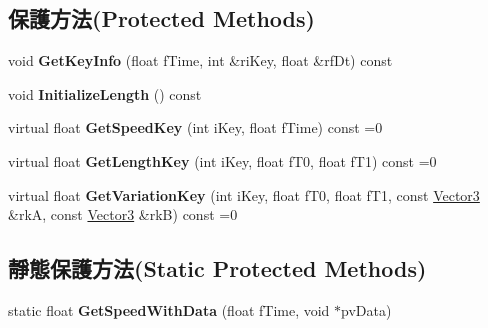 \subsection*{保護方法(Protected Methods)}
\begin{DoxyCompactItemize}
\item 
void {\bfseries Get\+Key\+Info} (float f\+Time, int \&ri\+Key, float \&rf\+Dt) const \hypertarget{class_magnum_1_1_multiple_curve3_a1b61f1be6ed93d15b55e7319123c106c}{}\label{class_magnum_1_1_multiple_curve3_a1b61f1be6ed93d15b55e7319123c106c}

\item 
void {\bfseries Initialize\+Length} () const \hypertarget{class_magnum_1_1_multiple_curve3_a25a54a8f5c91f1e4d8c8b242341c5318}{}\label{class_magnum_1_1_multiple_curve3_a25a54a8f5c91f1e4d8c8b242341c5318}

\item 
virtual float {\bfseries Get\+Speed\+Key} (int i\+Key, float f\+Time) const  =0\hypertarget{class_magnum_1_1_multiple_curve3_af207d1361fa9d6637723e585931fe285}{}\label{class_magnum_1_1_multiple_curve3_af207d1361fa9d6637723e585931fe285}

\item 
virtual float {\bfseries Get\+Length\+Key} (int i\+Key, float f\+T0, float f\+T1) const  =0\hypertarget{class_magnum_1_1_multiple_curve3_a8caa6abe7cc5243be84d302ee8bd0410}{}\label{class_magnum_1_1_multiple_curve3_a8caa6abe7cc5243be84d302ee8bd0410}

\item 
virtual float {\bfseries Get\+Variation\+Key} (int i\+Key, float f\+T0, float f\+T1, const \hyperlink{class_magnum_1_1_vector3}{Vector3} \&rkA, const \hyperlink{class_magnum_1_1_vector3}{Vector3} \&rkB) const  =0\hypertarget{class_magnum_1_1_multiple_curve3_ad1896aca01c7c957555384f7b538e375}{}\label{class_magnum_1_1_multiple_curve3_ad1896aca01c7c957555384f7b538e375}

\end{DoxyCompactItemize}
\subsection*{靜態保護方法(Static Protected Methods)}
\begin{DoxyCompactItemize}
\item 
static float {\bfseries Get\+Speed\+With\+Data} (float f\+Time, void $\ast$pv\+Data)\hypertarget{class_magnum_1_1_multiple_curve3_a31bb0e9f075d48bab542915ecb00980f}{}\label{class_magnum_1_1_multiple_curve3_a31bb0e9f075d48bab542915ecb00980f}

\end{DoxyCompactItemize}
